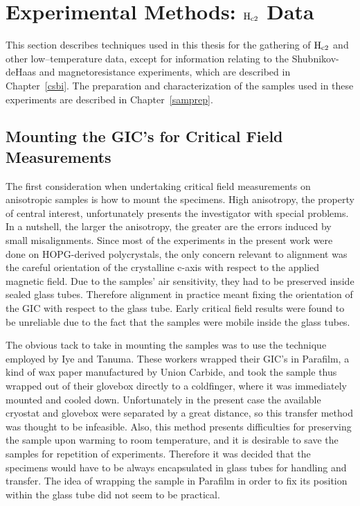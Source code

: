 \section{Experimental Methods: $\rm H_{c2}$ Data}
\label{critf:exp}

	This section  describes  techniques used   in  this thesis  for the
gathering  of $\rm  H_{c2}$  and other low--temperature  data,  except  for
information  relating  to    the  Shubnikov-deHaas  and   magnetoresistance
experiments, which are  described in Chapter~\ref{csbi}.   The  preparation
and characterization of the samples used in these experiments are described
in Chapter~\ref{samprep}.

\subsection{Mounting the GIC's for Critical Field Measurements}
\label{mounting}

	The   first   consideration    when   undertaking   critical  field
measurements on  an\-iso\-trop\-ic samples is  how to mount  the specimens.  High
anisotropy,  the property of  central  interest, unfortunately presents the
investigator with special  problems.    In   a nutshell, the  larger    the
anisotropy, the greater  are the  errors   induced by small  misalignments.
Since most of the experiments in the present work were done on HOPG-derived
polycrystals, the  only  concern relevant to   alignment  was  the  careful
orientation of the crystalline c-axis  with respect to the applied magnetic
field.  Due  to  the samples'  air  sensitivity, they  had to  be preserved
inside sealed glass  tubes.  Therefore alignment in practice  meant  fixing
the orientation of the GIC with respect to the glass  tube.  Early critical
field results were found to be unreliable due to the  fact that the samples
were mobile inside the glass tubes.

	The obvious tack to  take  in mounting the samples  was to  use the
technique  employed by Iye  and Tanuma.\cite{iye82}  These workers  wrapped
their GIC's in Parafilm, a kind of wax paper manufactured by Union Carbide,
and took  the  sample thus wrapped  out  of  their   glovebox directly to a
coldfinger,  where    it    was   immediately   mounted and   cooled  down.
Unfortunately in the present case the available  cryostat and glovebox were
separated by  a great distance, so  this transfer method  was thought to be
infeasible.  Also, this  method presents difficulties  for  preserving  the
sample upon warming  to room temperature,  and it is  desirable to save the
samples for  repetition of experiments.   Therefore it  was decided that the
specimens would have to be always encapsulated in glass  tubes for handling
and transfer.  The idea of wrapping the sample in Parafilm  in order to fix
its position within the glass tube did not seem to  be practical.

